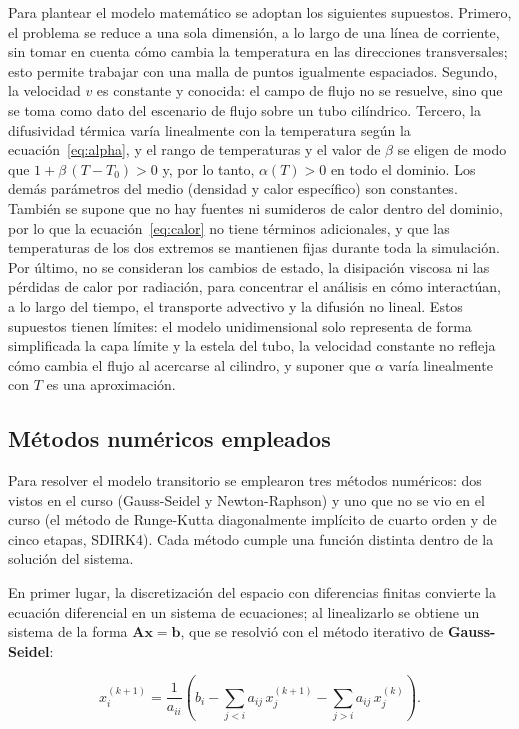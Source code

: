 \documentclass[final,5p,times,twocolumn,authoryear,11pt]{elsarticle}
\begin{document}
Para plantear el modelo matemático se adoptan los siguientes supuestos. Primero, el problema se reduce a una sola dimensión, a lo largo de una línea de corriente, sin tomar en cuenta cómo cambia la temperatura en las direcciones transversales; esto permite trabajar con una malla de puntos igualmente espaciados. Segundo, la velocidad $v$ es constante y conocida: el campo de flujo no se resuelve, sino que se toma como dato del escenario de flujo sobre un tubo cilíndrico. Tercero, la difusividad térmica varía linealmente con la temperatura según la ecuación~\eqref{eq:alpha}, y el rango de temperaturas y el valor de $\beta$ se eligen de modo que $1+\beta\,(T-T_0)>0$ y, por lo tanto, $\alpha(T)>0$ en todo el dominio. Los demás parámetros del medio (densidad y calor específico) son constantes. También se supone que no hay fuentes ni sumideros de calor dentro del dominio, por lo que la ecuación~\eqref{eq:calor} no tiene términos adicionales, y que las temperaturas de los dos extremos se mantienen fijas durante toda la simulación. Por último, no se consideran los cambios de estado, la disipación viscosa ni las pérdidas de calor por radiación, para concentrar el análisis en cómo interactúan, a lo largo del tiempo, el transporte advectivo y la difusión no lineal. Estos supuestos tienen límites: el modelo unidimensional solo representa de forma simplificada la capa límite y la estela del tubo, la velocidad constante no refleja cómo cambia el flujo al acercarse al cilindro, y suponer que $\alpha$ varía linealmente con $T$ es una aproximación.

\subsection{Métodos numéricos empleados}

Para resolver el modelo transitorio se emplearon tres métodos numéricos: dos vistos en el curso (Gauss-Seidel y Newton-Raphson) y uno que no se vio en el curso (el método de Runge-Kutta diagonalmente implícito de cuarto orden y de cinco etapas, SDIRK4). Cada método cumple una función distinta dentro de la solución del sistema.

En primer lugar, la discretización del espacio con diferencias finitas convierte la ecuación diferencial en un sistema de ecuaciones; al linealizarlo se obtiene un sistema de la forma $\mathbf{A}\mathbf{x}=\mathbf{b}$, que se resolvió con el método iterativo de \textbf{Gauss-Seidel}:

\begin{equation}
x_i^{(k+1)} = \frac{1}{a_{ii}} \left( b_i - \sum_{j<i} a_{ij}\, x_j^{(k+1)} - \sum_{j>i} a_{ij}\, x_j^{(k)} \right).
\label{eq:gauss_seidel}
\end{equation}
\end{document}
